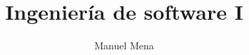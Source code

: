 \documentclass[a4paper]{article}
\theoremstyle{remark}
\theoremstyle{definition}
\theoremstyle{plain}
\begin{document}
\title{Ingeniería de software I}
\author{Manuel Mena}
\maketitle

\tableofcontents

\newpage

\end{document}
